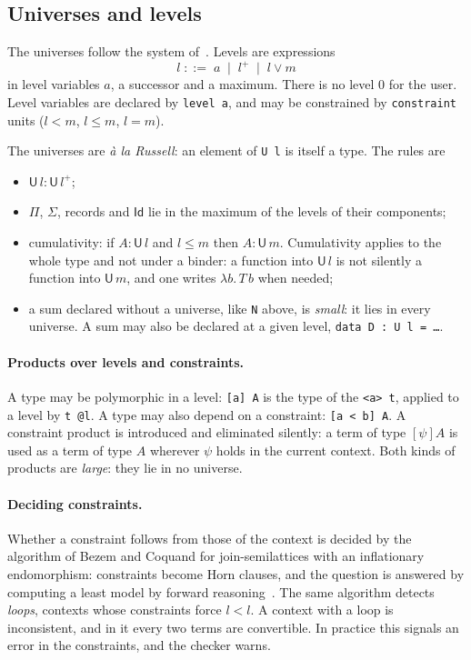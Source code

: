 \documentclass[11pt]{article}
\newcommand{\kw}[1]{\texttt{#1}}
\newcommand{\U}{\mathsf{U}}
\newcommand{\Id}{\mathsf{Id}}
\theoremstyle{remark}
\begin{document}
\subsection{Universes and levels}\label{sec:univ}

The universes follow the system of~\cite{BCDE}.
Levels are expressions
\[
l \;::=\; a \;\mid\; l^{+} \;\mid\; l\vee m
\]
in level variables $a$, a successor and a maximum. There is no level $0$ for
the user. Level variables are declared by \kw{level a}, and may be
constrained by \kw{constraint} units ($l<m$, $l\le m$, $l=m$).

The universes are \emph{\`a la Russell}: an element of \kw{U l} is itself a
type. The rules are
\begin{itemize}
\item $\U\,l : \U\,l^{+}$;
\item $\Pi$, $\Sigma$, records and $\Id$ lie in the maximum of the levels
  of their components;
\item cumulativity: if $A:\U\,l$ and $l\le m$ then $A:\U\,m$.
  Cumulativity applies to the whole type and not under a binder: a
  function into $\U\,l$ is not silently a function into $\U\,m$, and one
  writes $\lambda b.\,T\,b$ when needed;
\item a sum declared without a universe, like \kw{N} above, is
  \emph{small}: it lies in every universe. A sum may also be declared at a
  given level, \kw{data D : U l = \dots}.
\end{itemize}

\paragraph{Products over levels and constraints.} A type may be
polymorphic in a level: \kw{[a] A} is the type of the \kw{<a> t}, applied
to a level by \kw{t @l}. A type may also depend on a constraint:
\kw{[a < b] A}. A constraint product is introduced and eliminated
silently: a term of type $[\psi]A$ is used as a term of type $A$ wherever
$\psi$ holds in the current context. Both kinds of products are
\emph{large}: they lie in no universe.

\paragraph{Deciding constraints.} Whether a constraint follows from those
of the context is decided by the algorithm of Bezem and Coquand for
join-semilattices with an inflationary endomorphism: constraints become
Horn clauses, and the question is answered by computing a least model by
forward reasoning~\cite{BC}. The same algorithm detects \emph{loops}, contexts
whose constraints force $l<l$. A context with a loop is inconsistent, and
in it every two terms are convertible. In practice this signals an error
in the constraints, and the checker warns.
\end{document}
